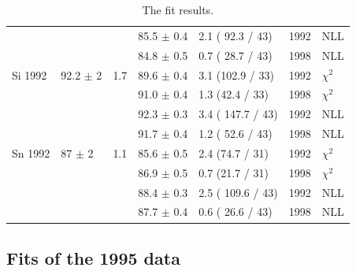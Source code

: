 \begin{table}[H]
\begin{center}
\begin{tabular}{|l||l|l|l|l|l|l|}
                 &                &     & 85.5 $\pm$ 0.4 & 2.1 ( 92.3 / 43) & 1992 & NLL \\
                 &                &     & 84.8 $\pm$ 0.5 & 0.7 ( 28.7 / 43) & 1998 & NLL \\
      \hline                                                                 
       Si 1992   & 92.2 $\pm$ 2   & 1.7 & 89.6 $\pm$ 0.4 &  3.1 (102.9 / 33)& 1992 & $\chi^2$ \\  
                 &                &     & 91.0 $\pm$ 0.4 &  1.3 (42.4 / 33) & 1998 & $\chi^2$ \\  
                                                                             
                 &                &     & 92.3 $\pm$ 0.3 & 3.4 ( 147.7 / 43)& 1992 & NLL \\
                 &                &     & 91.7 $\pm$ 0.4 & 1.2 ( 52.6 / 43) & 1998 & NLL \\
      \hline                                                                 
       Sn 1992   & 87   $\pm$ 2   & 1.1 & 85.6 $\pm$ 0.5 &  2.4 (74.7 / 31) & 1992 & $\chi^2$ \\  
                 &                &     & 86.9 $\pm$ 0.5 &  0.7 (21.7 / 31) & 1998 & $\chi^2$ \\  
                                                                             
                 &                &     & 88.4 $\pm$ 0.3 & 2.5 ( 109.6 / 43) & 1992 & NLL \\
                 &                &     & 87.7 $\pm$ 0.4 & 0.6 ( 26.6 / 43) & 1998 & NLL \\
      \hline                           
    \end{tabular}
  \end{center}
  \caption{The fit results.}
  \label{table:fits1992}
\end{table}

\subsection { Fits of the 1995 data }

